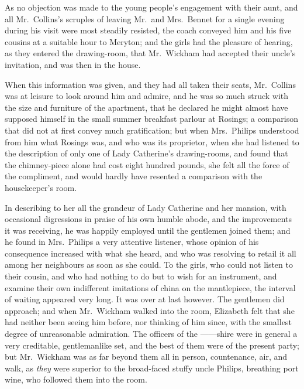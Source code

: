 
As no objection was made to the young people’s engagement
with their aunt, and all Mr.\ Collins’s scruples of
leaving Mr.\ and Mrs.\ Bennet for a single evening during
his visit were most steadily resisted, the coach conveyed
him and his five cousins at a suitable hour to Meryton;
and the girls had the pleasure of hearing, as they entered
the drawing-room, that Mr.\ Wickham had accepted their
uncle’s invitation, and was then in the house.

When this information was given, and they had all
taken their seats, Mr.\ Collins was at leisure to look around
him and admire, and he was so much struck with the size
and furniture of the apartment, that he declared he might
almost have supposed himself in the small summer
breakfast parlour at Rosings; a comparison that did not
at first convey much gratification; but when Mrs.\ Philips
understood from him what Rosings was, and who was its
proprietor, when she had listened to the description of
only one of Lady Catherine’s drawing-rooms, and found
that the chimney-piece alone had cost eight hundred
pounds, she felt all the force of the compliment, and would
hardly have resented a comparison with the housekeeper’s
room.

In describing to her all the grandeur of Lady Catherine
and her mansion, with occasional digressions in praise of
his own humble abode, and the improvements it was
receiving, he was happily employed until the gentlemen
joined them; and he found in Mrs.\ Philips a very attentive
listener, whose opinion of his consequence increased with
what she heard, and who was resolving to retail it all
among her neighbours as soon as she could. To the girls,
who could not listen to their cousin, and who had nothing
to do but to wish for an instrument, and examine their
own indifferent imitations of china on the mantlepiece, the
interval of waiting appeared very long. It was over at
last however. The gentlemen did approach; and when
Mr.\ Wickham walked into the room, Elizabeth felt that
she had neither been seeing him before, nor thinking of him
since, with the smallest degree of unreasonable admiration.
The officers of the \hbox{------shire} were in general a very creditable,
gentlemanlike set, and the best of them were of the
present party; but Mr.\ Wickham was as far beyond them
all in person, countenance, air, and walk, as \textit{they} were
superior to the broad-faced stuffy uncle Philips, breathing
port wine, who followed them into the room.

